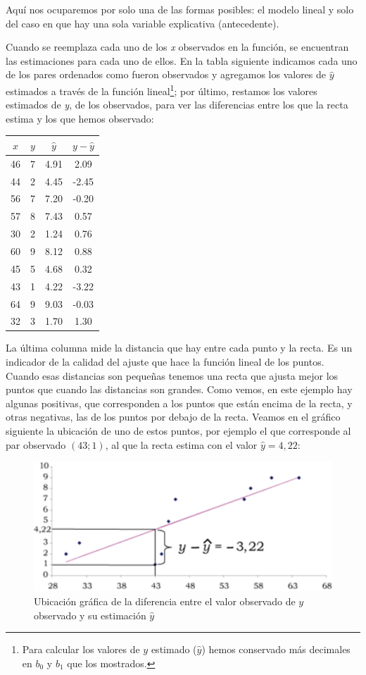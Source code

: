 \documentclass[]{book}
\let\rmarkdownfootnote\footnote%
\def\footnote{\protect\rmarkdownfootnote}
\begin{document}
Aquí nos ocuparemos por solo una de las formas posibles: el modelo lineal y solo del caso en que hay una sola variable explicativa (antecedente).

Cuando se reemplaza cada uno de los \emph{x} observados en la función, se
encuentran las estimaciones para cada uno de ellos. En la tabla
siguiente indicamos cada uno de los pares ordenados como fueron
observados y agregamos los valores de \(\widehat{y}\) estimados a través
de la función lineal\footnote{Para calcular los valores de \(y\) estimado (\(\widehat{y}\)) hemos conservado más decimales en \(b_0\) y \(b_1\) que los mostrados.}; por último, restamos los valores estimados de
\emph{y}, de los observados, para ver las diferencias entre los que la recta
estima y los que hemos observado:

\begin{longtable}[]{@{}cccc@{}}
\toprule
\(x\) & \(y\) & \(\widehat{y}\) & \(y - \widehat{y}\)\tabularnewline
\midrule
\endhead
46 & 7 & 4.91 & 2.09\tabularnewline
44 & 2 & 4.45 & -2.45\tabularnewline
56 & 7 & 7.20 & -0.20\tabularnewline
57 & 8 & 7.43 & 0.57\tabularnewline
30 & 2 & 1.24 & 0.76\tabularnewline
60 & 9 & 8.12 & 0.88\tabularnewline
45 & 5 & 4.68 & 0.32\tabularnewline
43 & 1 & 4.22 & -3.22\tabularnewline
64 & 9 & 9.03 & -0.03\tabularnewline
32 & 3 & 1.70 & 1.30\tabularnewline
\bottomrule
\end{longtable}

La última columna mide la distancia que hay entre cada punto y la recta.
Es un indicador de la calidad del ajuste que hace la función lineal de
los puntos. Cuando esas distancias son pequeñas tenemos una recta que
ajusta mejor los puntos que cuando las distancias son grandes. Como
vemos, en este ejemplo hay algunas positivas, que corresponden a los
puntos que están encima de la recta, y otras negativas, las de los
puntos por debajo de la recta. Veamos en el gráfico siguiente la
ubicación de uno de estos puntos, por ejemplo el que corresponde al par
observado \((43; 1)\), al que la recta estima con el valor \(\widehat{y} = 4,22\):

\begin{figure}

{\centering \includegraphics[width=4.86in]{imagenes/grafico13} 

}

\caption{Ubicación gráfica de la diferencia entre el valor observado de $y$ observado y su estimación $\widehat{y}$}\label{fig:unnamed-chunk-162}
\end{figure}
\end{document}
